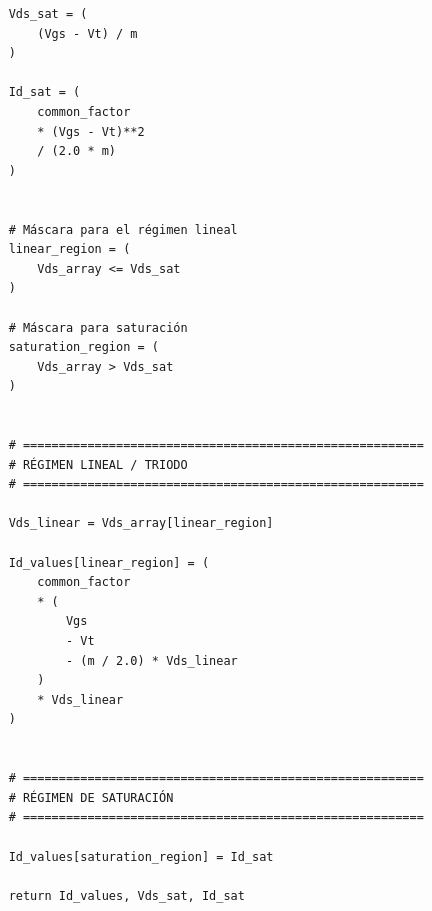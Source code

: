 \documentclass[a4paper, twoside, 10pt, spanish]{article}
\numberwithin{table}{section}
\begin{document}
\begin{verbatim}
    Vds_sat = (
        (Vgs - Vt) / m
    )

    Id_sat = (
        common_factor
        * (Vgs - Vt)**2
        / (2.0 * m)
    )


    # Máscara para el régimen lineal
    linear_region = (
        Vds_array <= Vds_sat
    )

    # Máscara para saturación
    saturation_region = (
        Vds_array > Vds_sat
    )


    # ========================================================
    # RÉGIMEN LINEAL / TRIODO
    # ========================================================

    Vds_linear = Vds_array[linear_region]

    Id_values[linear_region] = (
        common_factor
        * (
            Vgs
            - Vt
            - (m / 2.0) * Vds_linear
        )
        * Vds_linear
    )


    # ========================================================
    # RÉGIMEN DE SATURACIÓN
    # ========================================================

    Id_values[saturation_region] = Id_sat

    return Id_values, Vds_sat, Id_sat
\end{verbatim}
\end{document}
